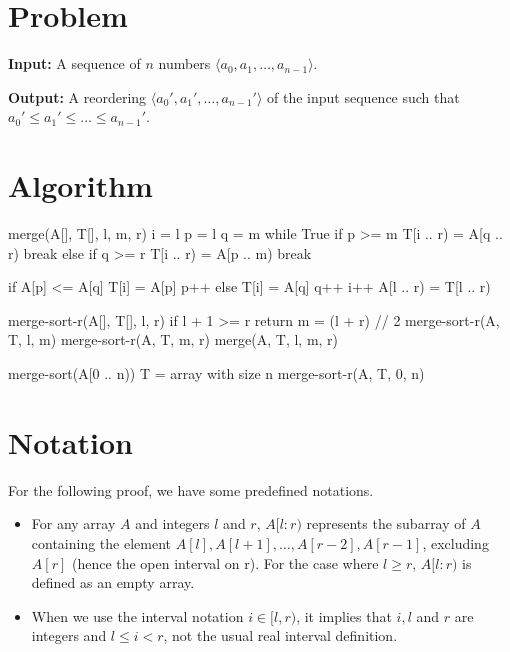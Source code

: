 \documentclass[12pt]{article}
\begin{document}
\section*{Problem}

\noindent\textbf{Input:} A sequence of \(n\) numbers \(\langle a_0, a_1, \dots, a_{n-1} \rangle\).

\noindent\textbf{Output:} A reordering \(\langle a_0', a_1', \dots, a_{n-1}' \rangle\) of the input sequence such that \(a_0' \leq a_1' \leq \dots \leq a_{n-1}'\).

\section*{Algorithm}

\begin{pseudocode}
merge(A[], T[], l, m, r)
    i = l
    p = l
    q = m
    while True
        if p >= m
            T[i .. r) = A[q .. r)
            break
        else if q >= r
            T[i .. r) = A[p .. m)
            break
        
        if A[p] <= A[q]
            T[i] = A[p]
            p++
        else
            T[i] = A[q]
            q++
        i++
    A[l .. r) = T[l .. r)

merge-sort-r(A[], T[], l, r)
    if l + 1 >= r
        return
    m = (l + r) // 2
    merge-sort-r(A, T, l, m)
    merge-sort-r(A, T, m, r)
    merge(A, T, l, m, r)

merge-sort(A[0 .. n))
    T = array with size n
    merge-sort-r(A, T, 0, n)
\end{pseudocode}

\newpage

\section*{Notation}

For the following proof, we have some predefined notations.
\begin{itemize}
    \item For any array \(A\) and integers \(l\) and \(r\), \(A[l : r)\) represents the subarray of \(A\) containing the element \(A[l], A[l+1], \dots, A[r-2], A[r-1]\), excluding \(A[r]\) (hence the open interval on r). For the case where \(l \geq r\), \(A[l : r)\) is defined as an empty array.
    \item When we use the interval notation \(i \in [l, r)\), it implies that \(i, l\) and \(r\) are integers and \(l \leq i < r\), not the usual real interval definition.
\end{itemize}
\end{document}
